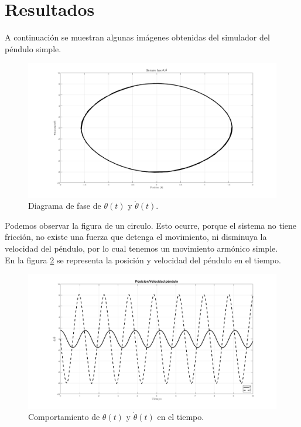 \section{Resultados}
A continuación se muestran algunas imágenes obtenidas del simulador del péndulo simple.



\begin{figure}[hb]
 \centering 
 \includegraphics[scale=0.35]{./img/faseNF.png}
\caption{Diagrama de fase de $\theta(t)$ y $\dot{\theta}(t)$.}
 \label{fig: phase plot - NF}
\end{figure}

Podemos observar la figura de un circulo. Esto ocurre, porque el sistema no tiene fricción, no existe una fuerza que detenga el movimiento, ni disminuya la velocidad del péndulo, por lo cual tenemos un movimiento armónico simple.\\

En la figura \ref{fig: time plot - NF} se representa la posición y velocidad del péndulo en el tiempo.

\begin{figure}[hb]
 \centering 
 \includegraphics[scale=0.35]{./img/PosVelNF.png}
 \caption{Comportamiento de $\theta(t)$ y $\dot{\theta}(t)$ en el tiempo.}
 \label{fig: time plot - NF}
\end{figure}

